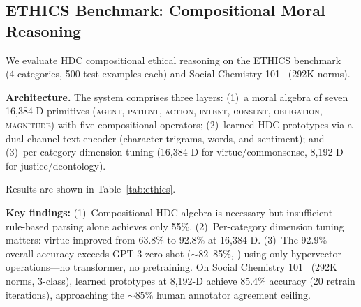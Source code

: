 \documentclass[10pt,letterpaper]{article}
\begin{document}
\subsection{ETHICS Benchmark: Compositional Moral Reasoning}
\label{sec:ethics}

We evaluate HDC compositional ethical reasoning on the ETHICS benchmark~\cite{hendrycks2021aligning} (4 categories, 500 test examples each) and Social Chemistry 101~\cite{forbes2020social} (292K norms).

\textbf{Architecture.} The system comprises three layers: (1)~a moral algebra of seven 16,384-D primitives (\textsc{agent}, \textsc{patient}, \textsc{action}, \textsc{intent}, \textsc{consent}, \textsc{obligation}, \textsc{magnitude}) with five compositional operators; (2)~learned HDC prototypes via a dual-channel text encoder (character trigrams, words, and sentiment); and (3)~per-category dimension tuning (16,384-D for virtue/commonsense, 8,192-D for justice/deontology).

Results are shown in Table~\ref{tab:ethics}.

\begin{table}[ht]
\centering
\caption{ETHICS benchmark results (500 test examples/category).}
\label{tab:ethics}
\small
{}
\end{table}

\textbf{Key findings:} (1)~Compositional HDC algebra is necessary but insufficient---rule-based parsing alone achieves only 55\%. (2)~Per-category dimension tuning matters: virtue improved from 63.8\% to 92.8\% at 16,384-D. (3)~The 92.9\% overall accuracy exceeds GPT-3 zero-shot (${\sim}82$--85\%, \cite{hendrycks2021aligning}) using only hypervector operations---no transformer, no pretraining. On Social Chemistry 101~\cite{forbes2020social} (292K norms, 3-class), learned prototypes at 8,192-D achieve 85.4\% accuracy (20 retrain iterations), approaching the ${\sim}85\%$ human annotator agreement ceiling.
\end{document}
